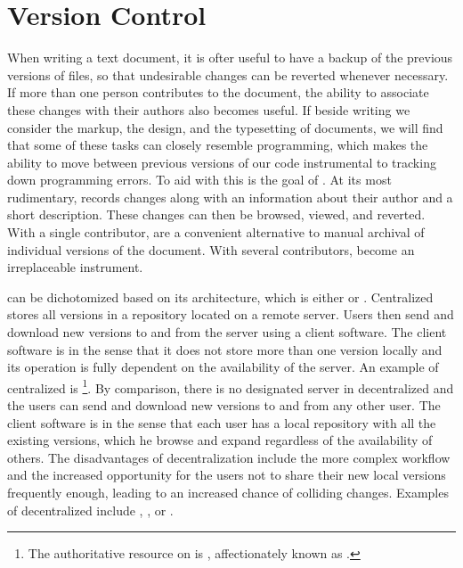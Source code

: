 \documentclass[
  a5paper,10pt,           %
  dvipsnames              %
]{book}
\begin{document}

\section{Version Control}\label{sec:vcs}
When writing a text document, it is ofter useful to have a backup of the
previous versions of files, so that undesirable changes can be reverted whenever
necessary. If more than one person contributes to the document, the ability to
associate these changes with their authors also becomes useful. If beside
writing we consider the markup, the design, and the typesetting of documents, we
will find that some of these tasks can closely resemble programming, which makes
the ability to move between previous versions of our code instrumental to
tracking down programming errors. To aid with this is the goal of .
At its most rudimentary,  records changes along with an information
about their author and a short description. These changes can then be browsed,
viewed, and reverted. With a single contributor,  are a convenient
alternative to manual archival of individual versions of the document. With
several contributors,  become an irreplaceable instrument.

 can be dichotomized based on its architecture, which is either
 or . Centralized  stores
all versions in a repository located on a remote server. Users then send and
download new versions to and from the server using a client software. The client
software is  in the sense that it does not store more than one
version locally and its operation is fully dependent on the availability of the
server. An example of centralized  is \footnote{
  The authoritative resource on  is ,
  affectionately known as .
}. By comparison, there is no designated server in decentralized 
and the users can send and download new versions to and from any other user. The
client software is  in the sense that each user has a local
repository with all the existing versions, which he browse and expand regardless
of the availability of others. The disadvantages of decentralization include the
more complex workflow and the increased opportunity for the users not to share
their new local versions frequently enough, leading to an increased chance of
colliding changes.  Examples of decentralized  include ,
, or .
\end{document}
